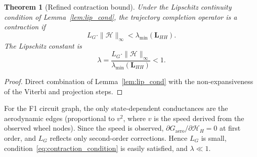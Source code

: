 \documentclass[twocolumn,10pt,a4paper]{article}
\newtheorem{theorem}{Theorem}[section]
\theoremstyle{definition}
\theoremstyle{remark}
\newcommand{\Hcal}{\mathcal{H}}
\newcommand{\vect}[1]{\boldsymbol{#1}}
\newcommand{\mat}[1]{\mathbf{#1}}
\begin{document}
\begin{theorem}[Refined contraction bound]\label{thm:refined_contraction}
Under the Lipschitz continuity condition of Lemma~\ref{lem:lip_cond}, the trajectory completion operator is a contraction if
\begin{equation}\label{eq:contraction_condition}
    L_G \cdot \|\vect{\Hcal}\|_\infty < \lambda_{\min}(\mat{L}_{HH}).
\end{equation}
The Lipschitz constant is
\begin{equation}
    \lambda = \frac{L_G \cdot \|\vect{\Hcal}\|_\infty}{\lambda_{\min}(\mat{L}_{HH})} < 1.
\end{equation}
\end{theorem}

\begin{proof}
Direct combination of Lemma~\ref{lem:lip_cond} with the non-expansiveness of the Viterbi and projection steps.
\end{proof}

For the F1 circuit graph, the only state-dependent conductances are the aerodynamic edges (proportional to $v^2$, where $v$ is the speed derived from the observed wheel nodes). Since the speed is observed, $\partial G_{\mathrm{aero}} / \partial \Hcal_{H} = 0$ at first order, and $L_G$ reflects only second-order corrections. Hence $L_G$ is small, condition~\eqref{eq:contraction_condition} is easily satisfied, and $\lambda \ll 1$.





\end{document}
